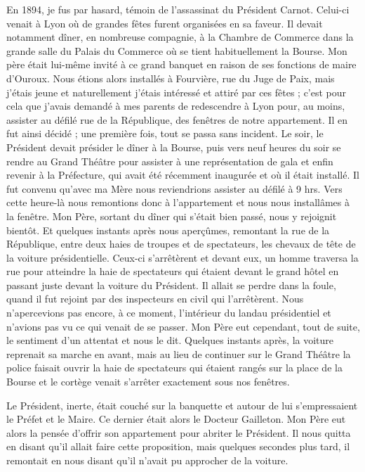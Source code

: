 \documentclass[11pt,a4paper]{report}
\begin{document}
En 1894, je fus par hasard, témoin de l'assassinat du Président Carnot. Celui-ci venait à Lyon où de grandes fêtes furent organisées en sa faveur. Il devait notamment dîner, en nombreuse compagnie, à la Chambre de Commerce dans la grande salle du Palais du Commerce où se tient habituellement la Bourse. Mon père était lui-même invité à ce grand banquet en raison de ses fonctions de maire d'Ouroux. Nous étions alors installés à Fourvière, rue du Juge de Paix, mais j'étais jeune et naturellement j'étais intéressé et attiré par ces fêtes ; c'est pour cela que j'avais demandé à mes parents de redescendre à Lyon pour, au moins, assister au défilé rue de la République, des fenêtres de notre appartement. Il en fut ainsi décidé ; une première fois, tout se passa sans incident. Le soir, le Président devait présider le dîner à la Bourse, puis vers neuf heures du soir se rendre au Grand Théâtre pour assister à une représentation de gala et enfin revenir à la Préfecture, qui avait été récemment inaugurée et où il était installé. Il fut convenu qu'avec ma Mère nous reviendrions assister au défilé à 9 hrs. Vers cette heure-là nous remontions donc à l'appartement et nous nous installâmes à la fenêtre. Mon Père, sortant du dîner qui s'était bien passé, nous y rejoignit bientôt. Et quelques instants après nous aperçûmes, remontant la rue de la République, entre deux haies de troupes et de spectateurs, les chevaux de tête de la voiture présidentielle. Ceux-ci s'arrêtèrent et devant eux, un homme traversa la rue pour atteindre la haie de spectateurs qui étaient devant le grand hôtel en passant juste devant la voiture du Président. Il allait se perdre dans la foule, quand il fut rejoint par des inspecteurs en civil qui l'arrêtèrent. Nous n'apercevions pas encore, à ce moment, l'intérieur du landau présidentiel et n'avions pas vu ce qui venait de se passer. Mon Père eut cependant, tout de suite, le sentiment d'un attentat et nous le dit. Quelques instants après, la voiture reprenait sa marche en avant, mais au lieu de continuer sur le Grand Théâtre la police faisait ouvrir la haie de spectateurs qui étaient rangés sur la place de la Bourse et le cortège venait s'arrêter exactement sous nos fenêtres.

Le Président, inerte, était couché sur la banquette et autour de lui s'empressaient le Préfet et le Maire. Ce dernier était alors le Docteur Gailleton. Mon Père eut alors la pensée d'offrir son appartement pour abriter le Président. Il nous quitta en disant qu'il allait faire cette proposition, mais quelques secondes plus tard, il remontait en nous disant qu'il n'avait pu approcher de la voiture.
\end{document}
